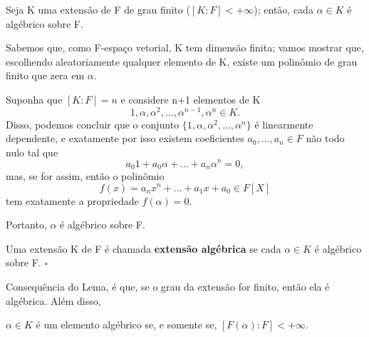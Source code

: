 \documentclass[../algebraIII_notes.tex]{subfiles}
\begin{document}
\begin{lemma*}
	Seja K uma extensão de F de grau finito (\([K:F]<+\infty\)); então, cada \(\alpha \in K\) é algébrico sobre F.
\end{lemma*}
\begin{proof*}
	Sabemos que, como F-espaço vetorial, K tem dimensão finita; vamos mostrar que, escolhendo aleatoriamente qualquer elemento de K, existe um polinômio de grau finito que zera em \(\alpha \).

	Suponha que \([K:F]=n\) e considere n+1 elementos de K
	\[
		1,\alpha , \alpha^{2},\dotsc , \alpha^{n-1}, \alpha ^{n}\in K.
	\]
	Disso, podemos concluir que o conjunto \(\{1,\alpha ,\alpha^{2},\dotsc ,\alpha^{n}\}\) é linearmente dependente, e exatamente por isso existem coeficientes \(a_{0}, \dotsc , a_{n}\in F\) não todo nulo tal que
	\[
		a_{0}1 + a_{0}\alpha  + \dotsc + a_{n}\alpha^{n}=0,
	\]
	mas, se for assim, então o polinômio
	\[
		f(x)=a_{n}x^{n}+\dotsc +a_1x+a_{0}\in F[X]
	\]
	tem exatamente a propriedade \(f(\alpha )=0.\)

	Portanto, \(\alpha \) é algébrico sobre F. \qedsymbol
\end{proof*}

\begin{def*}
	Uma extensão K de F é chamada \textbf{extensão algébrica} se cada \(\alpha \in K\) é algébrico sobre F. \(\square\)
\end{def*}
Consequência do Lema, é que, se o grau da extensão for finito, então ela é algébrica. Além disso,
\begin{crl*}
	\(\alpha \in K\) é um elemento algébrico se, e somente se, \([F(\alpha ):F]<+\infty\).
\end{crl*}
\end{document}
